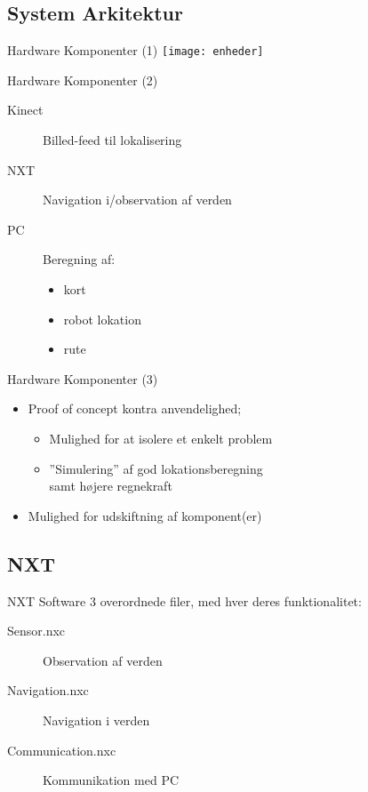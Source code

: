 \subsection{System Arkitektur}

\begin{frame}{Hardware Komponenter (1)}
\texttt{[image: enheder]}
\end{frame}

\begin{frame}{Hardware Komponenter (2)}
\begin{description}
\item[Kinect]{Billed-feed til lokalisering}
\item[NXT]{Navigation i/observation af verden}
\item[PC]{Beregning af:}
\begin{itemize}
\item{kort}
\item{robot lokation}
\item{rute}
\end{itemize}
\end{description}
\end{frame}

\begin{frame}{Hardware Komponenter (3)}
\begin{itemize}
\item{Proof of concept kontra anvendelighed;}
\begin{itemize}
\item{Mulighed for at isolere et enkelt problem}
\item{''Simulering'' af god lokationsberegning\\
samt højere regnekraft}
\end{itemize}
\item{Mulighed for udskiftning af komponent(er)}
\end{itemize}
\end{frame}

\subsection{NXT}

\begin{frame}{NXT Software}
3 overordnede filer, med hver deres funktionalitet:
\begin{description}
\item[Sensor.nxc]{Observation af verden}
\item[Navigation.nxc]{Navigation i verden}
\item[Communication.nxc]{Kommunikation med PC}
\end{description}
\end{frame}

